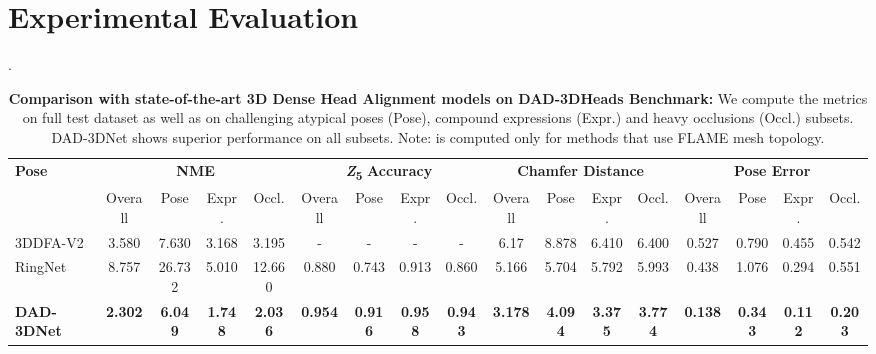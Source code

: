 \documentclass[10pt,twocolumn,letterpaper]{article}
\begin{document}
 \section{Experimental Evaluation}


\begin{table*}[h!tb]
\footnotesize
\centering
\caption{\textbf{Comparison with state-of-the-art 3D Dense Head Alignment models on DAD-3DHeads Benchmark:} We compute the metrics on full test dataset as well as on challenging atypical poses (Pose), compound expressions (Expr.) and heavy occlusions (Occl.) subsets. DAD-3DNet shows superior performance on all subsets. Note:  is computed only for methods that use FLAME mesh topology.}.
\resizebox{\textwidth}{!} {
    \begin{tabular}{@{}l|cccc|cccc|cccc|cccc@{}}
    \toprule \multirow{2}{*}{\textbf{Pose}}& 
        \multicolumn{4}{c}{\textbf{NME}{}} &
        \multicolumn{4}{c}{\textbf{\textit{Z}\textsubscript{5}} \textbf{Accuracy}{}} &
        \multicolumn{4}{c}{\textbf{Chamfer Distance}{}} & 
        \multicolumn{4}{c}{\textbf{Pose Error}{}} \\
                 & {Overall}  &  {Pose}  &  {Expr.}  &  {Occl.}    
                 & {Overall}  &  {Pose}  &  {Expr.}  &  {Occl.}  
                 & {Overall}  &  {Pose}  &  {Expr.}  &  {Occl.}  
                 & {Overall}  &  {Pose}  &  {Expr.}  &  {Occl.} \\\toprule 3DDFA-V2 \cite{3ddfa_cleardusk, guo2020towards}  & 3.580  &  7.630  &  3.168  &  3.195  &  
                   -  &  -  &  -  &  -  &  
                   6.17  &  8.878  &  6.410  &  6.400  & 
                   0.527  &  0.790  &  0.455  &  0.542   \\
        RingNet \cite{RingNet}  & 8.757  &  26.732  &  5.010  &  12.660  &  
                   0.880  &  0.743  &  0.913  &  0.860  &  
                   5.166  &  5.704  &  5.792  &  5.993  & 
                   0.438  &  1.076  &  	0.294  &  0.551   \\
        \textbf{DAD-3DNet}
                 & \textbf{2.302}  &  \textbf{6.049}  &  \textbf{1.748}  &  \textbf{2.036}  &  
                   \textbf{0.954}  &  \textbf{0.916}  &  \textbf{0.958}  &  \textbf{0.943}  &  
                   \textbf{3.178}  &  \textbf{4.094}  &  \textbf{3.375}  &  \textbf{3.774}  & 
                   \textbf{0.138}  &  \textbf{0.343}  &  \textbf{0.112}  &  \textbf{0.203}   \\\bottomrule
    \end{tabular}}
\label{T:dad_benchmark}
\end{table*}
 
\end{document}
